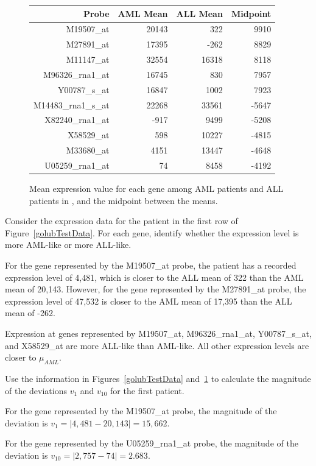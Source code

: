 \begin{figure}[h]
	\centering
	\begin{tabular}{r|r|r|r}
		\hline
		Probe & AML Mean & ALL Mean & Midpoint \\ 
		\hline
		M19507\_at & 20143 & 322 & 9910 \\ 
		M27891\_at & 17395 & -262 & 8829 \\ 
		M11147\_at & 32554 & 16318 & 8118 \\ 
		M96326\_rna1\_at & 16745 & 830 & 7957 \\ 
		Y00787\_s\_at & 16847 & 1002 & 7923 \\ 
		M14483\_rna1\_s\_at & 22268 & 33561 & -5647 \\ 
		X82240\_rna1\_at & -917 & 9499 & -5208 \\ 
		X58529\_at & 598 & 10227 & -4815 \\ 
		M33680\_at & 4151 & 13447 & -4648 \\ 
		U05259\_rna1\_at & 74 & 8458 & -4192 \\ 
		\hline
	\end{tabular}
		\caption{Mean expression value for each gene among AML patients and ALL patients in , and the midpoint between the means. \label{golubTrainMeansMidpoints}}
\end{figure}


\begin{examplewrap}
\begin{nexample}{Consider the expression data for the patient in the first row of Figure~\ref{golubTestData}. For each gene, identify whether the expression level is more AML-like or more ALL-like.}
	
For the gene represented by the M19507\_at probe, the patient has a recorded expression level of 4,481, which is closer to the ALL mean of 322 than the AML mean of 20,143. However, for the gene represented by the M27891\_at probe, the expression level of 47,532 is closer to the AML mean of 17,395 than the ALL mean of -262. 

Expression at genes represented by M19507\_at, M96326\_rna1\_at, Y00787\_s\_at, and X58529\_at are more ALL-like than AML-like. All other expression levels are closer to $\mu_{AML}$.
\end{nexample}
\end{examplewrap}

\begin{examplewrap}
\begin{nexample}{Use the information in Figures~\ref{golubTestData} and~\ref{golubTrainMeansMidpoints} to calculate the magnitude of the deviations $v_1$ and $v_{10}$ for the first patient.}
	
For the gene represented by the M19507\_at probe, the magnitude of the deviation is $v_1 = |4,481 - 20,143| = 15,662$.	

For the gene represented by the U05259\_rna1\_at probe, the magnitude of the deviation is $v_{10} = |2,757 - 74| = 2.683$.
\end{nexample}
\end{examplewrap}	

